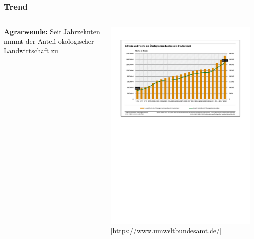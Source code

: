 \documentclass{beamer}
\begin{document}

\begin{frame}
\frametitle{Trend}
\begin{columns}[c] %

\textbf{Agrarwende:}
Seit Jahrzehnten nimmt der Anteil ökologischer Landwirtschaft zu

\includegraphics[scale=0.5]{oekolandbau.pdf}\\
\tiny [\url{https://www.umweltbundesamt.de/}]
\end{columns}
\end{frame}

\end{document}
